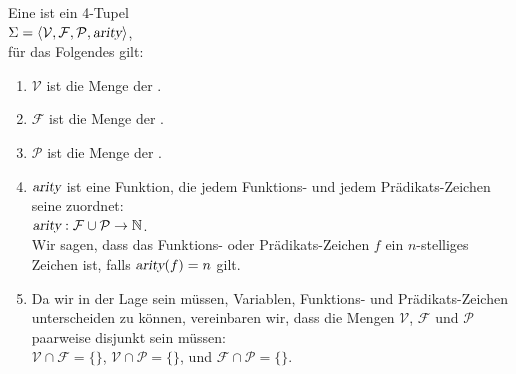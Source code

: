 \begin{Definition}[Signatur]
  Eine  ist ein 4-Tupel \\[0.2cm]
  \hspace*{1.3cm} $\Sigma = \langle \mathcal{V}, \mathcal{F}, \mathcal{P}, \textsl{arity} \rangle$, \\[0.2cm]
  für das Folgendes gilt: 
  \begin{enumerate}
  \item $\mathcal{V}$ ist die Menge der .
  \item $\mathcal{F}$ ist die Menge der .
  \item $\mathcal{P}$ ist die Menge der .
  \item $\textsl{arity}$ ist eine Funktion, die jedem Funktions- und jedem Prädikats-Zeichen seine
         zuordnet: \\[0.2cm]
        \hspace*{1.3cm} $\textsl{arity}: \mathcal{F} \cup \mathcal{P} \rightarrow \mathbb{N}$. \\[0.2cm]
        Wir sagen, dass das Funktions- oder Prädikats-Zeichen $f$ ein
        $n$-stelliges Zeichen ist, falls $\textsl{arity}(f) = n$ gilt.
  \item Da wir in der Lage sein müssen, Variablen, Funktions- und Prädikats-Zeichen
        unterscheiden zu können, vereinbaren wir, dass die Mengen $\mathcal{V}$,
        $\mathcal{F}$ und $\mathcal{P}$ paarweise disjunkt sein müssen: \\[0.2cm] 
        \hspace*{1.3cm} $\mathcal{V} \cap \mathcal{F} = \{\}$, \quad
                        $\mathcal{V} \cap \mathcal{P} = \{\}$, \quad und \quad
                        $\mathcal{F} \cap \mathcal{P} = \{\}$. \eox
  \end{enumerate}
\end{Definition}


